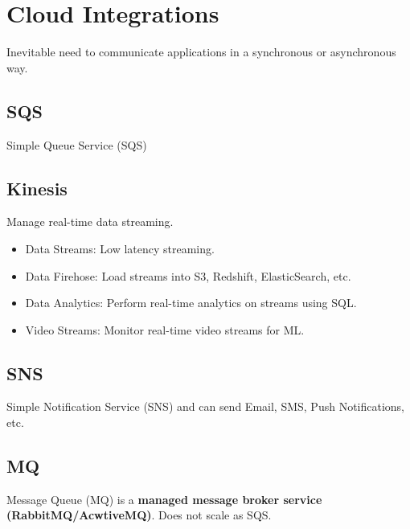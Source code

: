 \section{Cloud Integrations}\label{sec:cloud-integrations}
Inevitable need to communicate applications in a synchronous or asynchronous way.

\subsection{SQS}\label{subsec:sqs}
Simple Queue Service (SQS)

\subsection{Kinesis}\label{subsec:kinesis}
Manage real-time data streaming.

\begin{itemize}
    \item{Data Streams:} Low latency streaming.
    \item{Data Firehose:} Load streams into S3, Redshift, ElasticSearch, etc.
    \item{Data Analytics:} Perform real-time analytics on streams using SQL\@.
    \item{Video Streams:} Monitor real-time video streams for ML\@.
\end{itemize}

\subsection{SNS}\label{subsec:sns}
Simple Notification Service (SNS)  and
can send Email, SMS, Push Notifications, etc.

\subsection{MQ}\label{subsec:mq}
Message Queue (MQ) is a \textbf{managed message broker service (RabbitMQ/AcwtiveMQ)}.
Does not scale as SQS\@.

